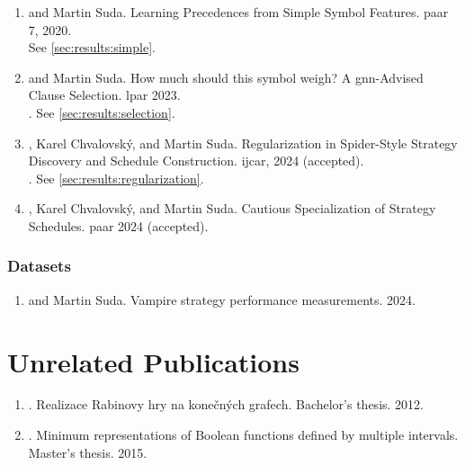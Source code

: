 \begin{enumerate}

\item {} and Martin Suda. Learning Precedences from Simple Symbol Features. \Gls{paar} 7, 2020. \cite{DBLP:conf/cade/Bartek020}
\\
See \cref{sec:results:simple}.

\item {} and Martin Suda. How much should this symbol weigh? A \acrshort{gnn}-Advised Clause Selection. \Gls{lpar} 2023. \cite{DBLP:conf/lpar/Bartek023}
\\
. See \cref{sec:results:selection}.

\item {}, Karel Chvalovský, and Martin Suda. Regularization in Spider-Style Strategy Discovery and Schedule Construction. \Gls{ijcar}, 2024 (accepted). \cite{bartek2024regularization}
\\
. See \cref{sec:results:regularization}.

\item {}, Karel Chvalovský, and Martin Suda. Cautious Specialization of Strategy Schedules. \Gls{paar} 2024 (accepted).

\end{enumerate}


\subsubsection{Datasets}

\begin{enumerate}
\item {} and Martin Suda. Vampire strategy performance measurements. 2024. \cite{bartek10814478}
\end{enumerate}

\section{Unrelated Publications}

\begin{enumerate}
\item {}. \foreignlanguage{czech}{Realizace Rabinovy hry na konečných grafech}. Bachelor's thesis. 2012. \cite{Bartek2012thesis}
\item {}. Minimum representations of Boolean functions defined by multiple intervals. Master's thesis. 2015. \cite{bartek2015}
\end{enumerate}

